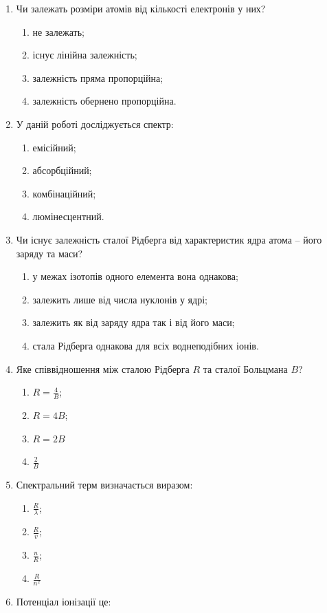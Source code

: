 \documentclass[twocolumn]{el-author}
\begin{document}
\begin{enumerate}
	\item Чи залежать розміри атомів від кількості електронів у них?
	\begin{enumerate}
		\item не залежать;
		\item існує лінійна залежність;
		\item залежність пряма пропорційна;
		\item залежність обернено пропорційна.
	\end{enumerate}
	\item  У даній роботі досліджується спектр:
	\begin{enumerate}
		\item емісійний;
		\item абсорбційний;
		\item комбінаційний;
		\item люмінесцентний.
	\end{enumerate}
	\item Чи існує залежність сталої Рідберга від характеристик ядра атома -- його
заряду та маси?
	\begin{enumerate}
		\item у межах ізотопів одного елемента вона однакова;
		\item залежить лише від числа нуклонів у ядрі;
		\item залежить як від заряду ядра так і від його маси;
		\item стала Рідберга однакова для всіх воднеподібних іонів.
	\end{enumerate}
	\item Яке співвідношення між сталою Рідберга $R$ та сталої Больцмана $B$?
	\begin{enumerate}
		\item $R = \frac{4}{B}$;
		\item $R = 4B$;
		\item $R = 2B$
		\item $\frac{2}{B}$
	\end{enumerate}
	\item Спектральний терм визначається виразом:
	\begin{enumerate}
		\item $\frac{R}{\lambda}$;
		\item $\frac{R}{v}$;
		\item $\frac{n}{R}$;
		\item $\frac{R}{n^{2}}$
	\end{enumerate}
	\item Потенціал іонізації це:

\end{enumerate}
\end{document}
